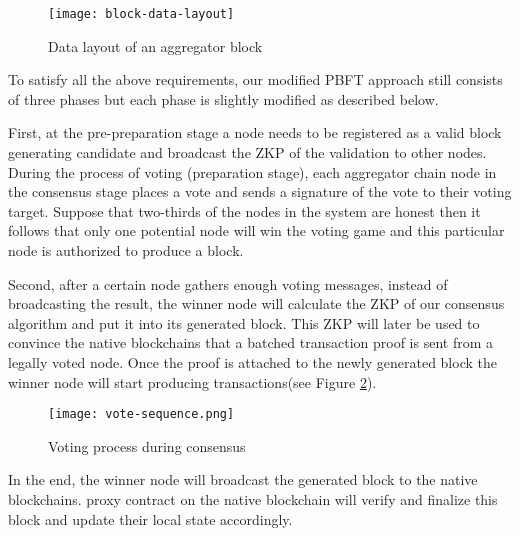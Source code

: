 \begin{figure}[!ht]
\begin{center}
\texttt{[image: block-data-layout]}
\end{center}
\caption{Data layout of an aggregator block}
\label{block-layout}
\end{figure}

To satisfy all the above requirements, our modified PBFT approach still consists of three phases but each phase is slightly modified as described below.

First, at the pre-preparation stage a node needs to be registered as a valid block generating candidate and broadcast the ZKP of the validation to other nodes. During the process of voting (preparation stage), each aggregator chain node in the consensus stage places a vote and sends a signature of the vote to their voting target. Suppose that two-thirds of the nodes in the system are honest then it follows that only one potential node will win the voting game and this particular node is authorized to produce a block.

Second, after a certain node gathers enough voting messages, instead of broadcasting the result, the winner node will calculate the ZKP of our consensus algorithm and put it into its generated block. This ZKP will later be used to convince the native blockchains that a batched transaction proof is sent from a legally voted node. Once the proof is attached to the newly generated block the winner node will start producing transactions(see Figure \ref{vote-sequence}).

\begin{figure}[!ht]
\texttt{[image: vote-sequence.png]}
\caption{Voting process during consensus}
\label{vote-sequence}
\end{figure}

In the end, the winner node will broadcast the generated block to the native blockchains. \dprotocol proxy contract on the native blockchain will verify and finalize this block and update their local state accordingly.

